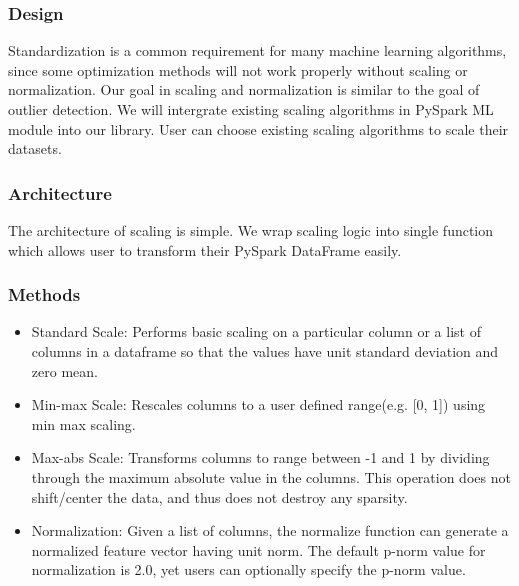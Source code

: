 \documentclass[sigconf]{acmart}
\begin{document}
\subsubsection{Design}
Standardization is a common requirement for many machine learning algorithms, since some optimization methods will not work properly without scaling or normalization\cite{convex}. Our goal in scaling and normalization is similar to the goal of outlier detection. We will intergrate existing scaling algorithms in PySpark ML module into our library. User can choose existing scaling algorithms to scale their datasets. %

\subsubsection{Architecture}
The architecture of scaling is simple. We wrap scaling logic into single function which allows user to transform their PySpark DataFrame easily.

\subsubsection{Methods}
\begin{itemize}
	\item{Standard Scale}: Performs basic scaling on a particular column or a list of columns in a dataframe so that the values have unit standard deviation and zero mean. 
	\item{Min-max Scale}: Rescales columns to a user defined range(e.g. [0, 1]) using min max scaling.
	\item{Max-abs Scale}: Transforms columns to range between -1 and 1 by dividing through the maximum absolute value in the columns. This operation does not shift/center the data, and thus does not destroy any sparsity. 
	\item{Normalization}: Given a list of columns, the normalize function can generate a normalized feature vector having unit norm. The default p-norm value for normalization is 2.0, yet users can optionally specify the p-norm value.
\end{itemize}
\end{document}
